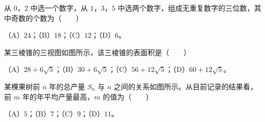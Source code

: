 \begin{question}
从 $0$，$2$ 中选一个数字，从 $1$，$3$，$5$ 中选两个数字，组成无重复数字的三位数，其中奇数的个数为\mbox{（　　）}

（A）$24$；（B）$18$；（C）$12$；（D）$6$。

\Needspace{0.4\textheight}
\end{question}
\begin{question}
某三棱锥的三视图如图所示，该三棱锥的表面积是\mbox{（　　）}
\nopagebreak[4]
\begin{center}\end{center}
\nopagebreak[4]
（A）$28+6\sqrt5$；（B）$30+6\sqrt5$；（C）$56+12\sqrt5$；（D）$60+12\sqrt5$。

\Needspace{0.4\textheight}
\end{question}
\begin{question}
某棵果树前 $n$ 年的总产量 $S_n$ 与 $n$ 之间的关系如图所示。从目前记录的结果看，前 $m$ 年的年平均产量最高，$m$ 的值为\mbox{（　　）}
\nopagebreak[4]
\begin{center}\end{center}
\nopagebreak[4]
（A）$5$；（B）$7$；（C）$9$；（D）$11$。

\end{question}

